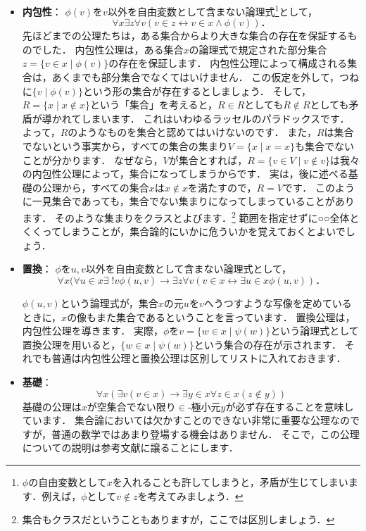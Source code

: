\documentclass[./main]{subfiles}
\newcommand{\tbf}{\textbf}
\begin{document}
\begin{itemize}
\item
\tbf{内包性}：
$\phi(v)$を$v$以外を自由変数として含まない論理式\footnote{$\phi$の自由変数として$x$を入れることも許してしまうと，矛盾が生じてしまいます．例えば，$\phi$として$v\notin z$を考えてみましょう．}として，
\[
\forall x\exists z\forall v(v\in z\leftrightarrow v\in x\wedge\phi(v))．
\]
先ほどまでの公理たちは，ある集合からより大きな集合の存在を保証するものでした．
内包性公理は，ある集合$x$の論理式で規定された部分集合$z=\{v\in x\mid\phi(v)\}$の存在を保証します．
内包性公理によって構成される集合は，あくまでも部分集合でなくてはいけません．
この仮定を外して，つねに$\{v\mid\phi(v)\}$という形の集合が存在するとしましょう．
そして，$R=\{x\mid x\notin x\}$という「集合」を考えると，$R\in R$としても$R\notin R$としても矛盾が導かれてしまいます．
これはいわゆるラッセルのパラドックスです．
よって，$R$のようなものを集合と認めてはいけないのです．
また，$R$は集合でないという事実から，すべての集合の集まり$V=\{x\mid x=x\}$も集合でないことが分かります．
なぜなら，$V$が集合とすれば，$R=\{v\in V\mid v\notin v\}$は我々の内包性公理によって，集合になってしまうからです．
実は，後に述べる基礎の公理から，すべての集合$x$は$x\notin x$を満たすので，$R=V$です．
このように一見集合であっても，集合でない集まりになってしまっていることがあります．
そのような集まりをクラスとよびます．\footnote{集合もクラスだということもありますが，ここでは区別しましょう．}
範囲を指定せずに○○全体とくくってしまうことが，集合論的にいかに危ういかを覚えておくとよいでしょう．

\item
\tbf{置換}：
$\phi$を$u,v$以外を自由変数として含まない論理式として，
\[
\forall x(\forall u\in x\exists\;! v\phi(u,v)\to\exists z\forall v(v\in x\leftrightarrow\exists u\in x\phi(u,v))．
\]

$\phi(u, v)$という論理式が，集合$x$の元$u$を$v$へうつすような写像を定めているときに，$x$の像もまた集合であるということを言っています．
置換公理は，内包性公理を導きます．
実際，$\phi$を$v=\{w\in x\mid \psi(w)\}$という論理式として置換公理を用いると，$\{w\in x\mid\psi(w)\}$という集合の存在が示されます．
それでも普通は内包性公理と置換公理は区別してリストに入れておきます．

\item
\tbf{基礎}：
\[
\forall x(\exists v(v\in x)\to\exists y\in x\forall z\in x(z\notin y))
\]
基礎の公理は$x$が空集合でない限り$\in$-極小元$y$が必ず存在することを意味しています．
集合論においては欠かすことのできない非常に重要な公理なのですが，普通の数学ではあまり登場する機会はありません．
そこで，この公理についての説明は参考文献に譲ることにします．
\end{itemize}
\end{document}
